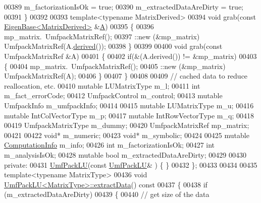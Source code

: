 \begin{DoxyCode}
00389       m\_factorizationIsOk = \textcolor{keyword}{true};
00390       m\_extractedDataAreDirty = \textcolor{keyword}{true};
00391     \}
00392 
00393     \textcolor{keyword}{template}<\textcolor{keyword}{typename} MatrixDerived>
00394     \textcolor{keywordtype}{void} grab(\textcolor{keyword}{const} \hyperlink{group___core___module_struct_eigen_1_1_eigen_base}{EigenBase<MatrixDerived>} &\hyperlink{group___core___module_class_eigen_1_1_matrix}{A})
00395     \{
00396       mp\_matrix.~UmfpackMatrixRef();
00397       ::new (&mp\_matrix) UmfpackMatrixRef(A.\hyperlink{group___core___module_a324b16961a11d2ecfd2d1b7dd7946545}{derived}());
00398     \}
00399 
00400     \textcolor{keywordtype}{void} grab(\textcolor{keyword}{const} UmfpackMatrixRef &A)
00401     \{
00402       \textcolor{keywordflow}{if}(&(A.derived()) != &mp\_matrix)
00403       \{
00404         mp\_matrix.~UmfpackMatrixRef();
00405         ::new (&mp\_matrix) UmfpackMatrixRef(A);
00406       \}
00407     \}
00408 
00409     \textcolor{comment}{// cached data to reduce reallocation, etc.}
00410     \textcolor{keyword}{mutable} LUMatrixType m\_l;
00411     \textcolor{keywordtype}{int} m\_fact\_errorCode;
00412     UmfpackControl m\_control;
00413     \textcolor{keyword}{mutable} UmfpackInfo m\_umfpackInfo;
00414 
00415     \textcolor{keyword}{mutable} LUMatrixType m\_u;
00416     \textcolor{keyword}{mutable} IntColVectorType m\_p;
00417     \textcolor{keyword}{mutable} IntRowVectorType m\_q;
00418 
00419     UmfpackMatrixType m\_dummy;
00420     UmfpackMatrixRef mp\_matrix;
00421 
00422     \textcolor{keywordtype}{void}* m\_numeric;
00423     \textcolor{keywordtype}{void}* m\_symbolic;
00424 
00425     \textcolor{keyword}{mutable} \hyperlink{group__enums_ga85fad7b87587764e5cf6b513a9e0ee5e}{ComputationInfo} m\_info;
00426     \textcolor{keywordtype}{int} m\_factorizationIsOk;
00427     \textcolor{keywordtype}{int} m\_analysisIsOk;
00428     \textcolor{keyword}{mutable} \textcolor{keywordtype}{bool} m\_extractedDataAreDirty;
00429 
00430   \textcolor{keyword}{private}:
00431     \hyperlink{class_eigen_1_1_umf_pack_l_u}{UmfPackLU}(\textcolor{keyword}{const} \hyperlink{class_eigen_1_1_umf_pack_l_u}{UmfPackLU}& ) \{ \}
00432 \};
00433 
00434 
00435 \textcolor{keyword}{template}<\textcolor{keyword}{typename} MatrixType>
00436 \textcolor{keywordtype}{void} \hyperlink{class_eigen_1_1_umf_pack_l_u}{UmfPackLU<MatrixType>::extractData}()\textcolor{keyword}{ const}
00437 \textcolor{keyword}{}\{
00438   \textcolor{keywordflow}{if} (m\_extractedDataAreDirty)
00439   \{
00440     \textcolor{comment}{// get size of the data}

\end{DoxyCode}
